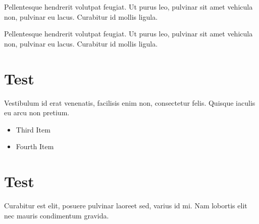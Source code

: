 \documentclass{scrartcl}
\begin{document}
Pellentesque hendrerit volutpat feugiat. Ut purus
leo, pulvinar sit amet vehicula non, pulvinar eu
lacus. Curabitur id mollis ligula.

Pellentesque hendrerit volutpat feugiat. Ut purus
leo, pulvinar sit amet vehicula non, pulvinar eu
lacus. Curabitur id mollis ligula.

\section{Test}

Vestibulum id erat venenatis, facilisis enim non,
consectetur felis. Quisque iaculis eu arcu non pretium.

\begin{itemize}
\item Third Item
\item Fourth Item
\end{itemize}

\section{Test}
Curabitur est elit, posuere pulvinar laoreet sed, varius
id mi. Nam lobortis elit nec mauris condimentum gravida.
\end{document}
